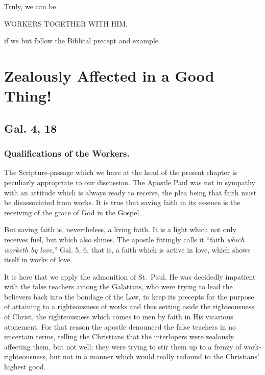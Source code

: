 \documentclass[
]{book}
\begin{document}
Truly, we can be

\begin{center} WORKERS TOGETHER WITH HIM, \end{center}

if we but follow the Biblical precept and example.

\chapter{Zealously Affected in a Good Thing!}\label{zealously-affected-in-a-good-thing}

\section*{Gal. 4, 18}\label{gal.-4-18}

\subsection*{Qualifications of the Workers.}\label{qualifications-of-the-workers.}

The Scripture-passage which we have at the head of the present chapter is peculiarly appropriate to our discussion. The Apostle Paul was not in sympathy with an attitude which is always ready to receive, the plea being that faith must be disassociated from works. It is true that saving faith in its essence is the receiving of the grace of God in the Gospel.

But saving faith is, nevertheless, a living faith. It is a light which not only receives fuel, but which also shines. The apostle fittingly calls it ``faith \emph{which worketh by love},'' Gal. 5, 6, that is, a faith which is active in love, which shows itself in works of love.

It is here that we apply the admonition of St.~Paul. He was decidedly impatient with the false teachers among the Galatians, who were trying to lead the believers back into the bondage of the Law, to keep its precepts for the purpose of attaining to a righteousness of works and thus setting aside the righteousness of Christ, the righteousness which comes to men by faith in His vicarious atonement. For that reason the apostle denounced the false teachers in no uncertain terms, telling the Christians that the interlopers were zealously affecting them, but not well; they were trying to stir them up to a frenzy of work-righteousness, but not in a manner which would really redound to the Christians' highest good.
\end{document}
